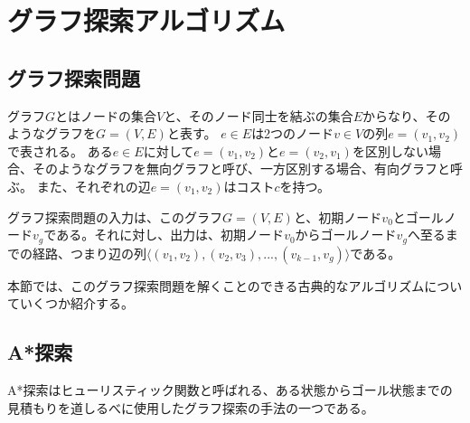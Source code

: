 \documentclass[a4paper,11pt,oneside,openany]{jsbook}
\begin{document}


\section{グラフ探索アルゴリズム}
\subsection{グラフ探索問題}
グラフ$G$とはノードの集合$V$と、そのノード同士を結ぶの集合$E$からなり、そのようなグラフを$G=(V,E)$と表す。
$e \in E$は2つのノード$v \in V$の列$e = (v_{1}, v_{2})$で表される。
ある$e \in E$に対して$e = (v_{1}, v_{2})$と$e = (v_{2}, v_{1})$を区別しない場合、そのようなグラフを無向グラフと呼び、一方区別する場合、有向グラフと呼ぶ。
また、それぞれの辺$e = (v_{1}, v_{2})$はコスト$c$を持つ。

グラフ探索問題の入力は、このグラフ$G=(V,E)$と、初期ノード$v_0$とゴールノード$v_g$である。それに対し、出力は、初期ノード$v_0$からゴールノード$v_g$へ至るまでの経路、つまり辺の列$\langle(v_{1}, v_{2}), (v_{2}, v_{3}), ...,(v_{k-1}, v_{g}) \rangle$である。

本節では、このグラフ探索問題を解くことのできる古典的なアルゴリズムについていくつか紹介する。

\subsection{A*探索}
A*探索\cite{HNR68}はヒューリスティック関数と呼ばれる、ある状態からゴール状態までの見積もりを道しるべに使用したグラフ探索の手法の一つである。
\end{document}
